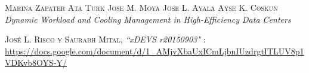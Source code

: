 \begin{thebibliography}{99}

 \textsc{Marina Zapater Ata Turk Jose M. Moya Jose L. Ayala Ayse K. Coskun}
 \textit{Dynamic Workload and Cooling Management in High-Efficiency Data Centers}

 \textsc{José L. Risco y Saurabh Mital}, \textit{``xDEVS r20150903"} : {\small \url{https://docs.google.com/document/d/1_AMjvXbaUxICmLjbnIUzdrgtITLUV8p1VDKvb8OYS-Y/}}

\end{thebibliography}
